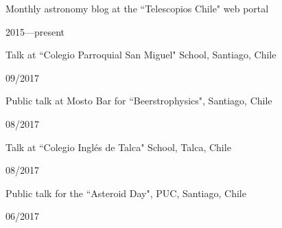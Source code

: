 \documentclass[12pt, a4paper]{article} %
\begin{document}

\begin{minipage}[t]{0.7\textwidth}
\begin{flushleft}%
  \setlength{\leftskip}{0.2cm}%
Monthly astronomy blog at the ``Telescopios Chile" web portal
\end{flushleft}
\end{minipage}
\begin{minipage}[t]{0.3\textwidth}
\hfill 2015---present
\end{minipage}

\begin{minipage}[t]{0.7\textwidth}
\begin{flushleft}%
  \setlength{\leftskip}{0.2cm}%
Talk at ``Colegio Parroquial San Miguel" School, Santiago, Chile
\end{flushleft}
\end{minipage}
\begin{minipage}[t]{0.3\textwidth}
\hfill 09/2017
\end{minipage}

\begin{minipage}[t]{0.7\textwidth}
\begin{flushleft}%
  \setlength{\leftskip}{0.2cm}%
Public talk at Mosto Bar for ``Beerstrophysics", Santiago, Chile
\end{flushleft}
\end{minipage}
\begin{minipage}[t]{0.3\textwidth}
\hfill 08/2017
\end{minipage}

\begin{minipage}[t]{0.7\textwidth}
\begin{flushleft}%
  \setlength{\leftskip}{0.2cm}%
Talk at ``Colegio Ingl\'es de Talca" School, Talca, Chile
\end{flushleft}
\end{minipage}
\begin{minipage}[t]{0.3\textwidth}
\hfill 08/2017
\end{minipage}

\begin{minipage}[t]{0.7\textwidth}
\begin{flushleft}%
  \setlength{\leftskip}{0.2cm}%
Public talk for the ``Asteroid Day", PUC, Santiago, Chile
\end{flushleft}
\end{minipage}
\begin{minipage}[t]{0.3\textwidth}
\hfill 06/2017
\end{minipage}
\end{document}
